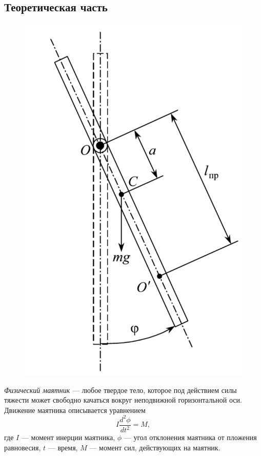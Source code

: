 \documentclass[12pt]{article}
\begin{document}
	\subsection*{Теоретическая часть}
	\begin{figure}
		\includegraphics[width=\linewidth]{physm_pic}
		\label{physm_pic}	
	\end{figure}
	
	\textit{Физический маятник} --- любое твердое тело, которое под действием силы тяжести может свободно качаться вокруг неподвижной горизонтальной оси. Движение маятника описывается уравнением
	\begin{equation}\label{eq1}
		I\frac{d^2\phi}{dt^2}=M,
	\end{equation}
	где $I$ --- момент инерции маятника, $\phi$ --- угол отклонения маятника от пложения равновесия, $t$ --- время, $M$ --- момент сил, действующих на маятник.
	
\end{document}
